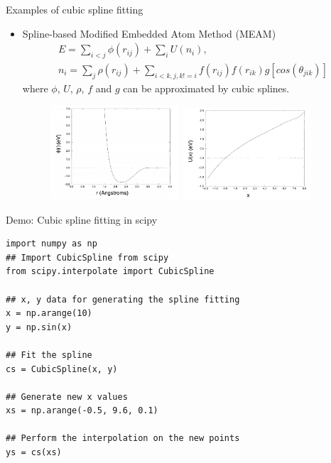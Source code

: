 \documentclass[aspectratio=169]{beamer}
\begin{document}
\begin{frame}{Examples of cubic spline fitting}
    \begin{itemize}
        \item Spline-based Modified Embedded Atom Method (MEAM)
        \begin{eqnarray*}
            E = \sum_{i <j} \phi(r_{ij}) + \sum_i U(n_i), \\
            n_i = \sum_j \rho(r_{ij}) + \sum_{i < k, j,k!=i} f(r_{ij}) f(r_{ik})g[cos(\theta_{jik})]
        \end{eqnarray*}
        where $\phi$, $U$, $\rho$, $f$ and $g$ can be approximated by cubic splines. 
        \begin{figure}
            \centering
            \includegraphics[width=0.45\textwidth]{figures/meam-phi.png}
            \includegraphics[width=0.45\textwidth]{figures/meam-u.png}

        \end{figure}
    \end{itemize}
\end{frame} 


\begin{frame}[fragile]{Demo: Cubic spline fitting in scipy}
    \begin{verbatim}
import numpy as np
## Import CubicSpline from scipy
from scipy.interpolate import CubicSpline

## x, y data for generating the spline fitting
x = np.arange(10)
y = np.sin(x)

## Fit the spline
cs = CubicSpline(x, y)

## Generate new x values
xs = np.arange(-0.5, 9.6, 0.1)

## Perform the interpolation on the new points
ys = cs(xs)
\end{verbatim}
\end{frame} 
\end{document}

